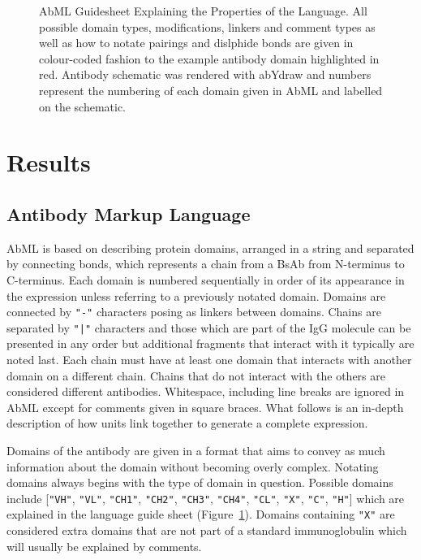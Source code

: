 \documentclass{article}
\begin{document}
\begin{figure}
\caption{\label{fig:1} AbML Guidesheet Explaining the Properties of
the Language. All possible domain types, modifications, linkers and
comment types as well as how to notate pairings and dislphide bonds
are given in colour-coded fashion to the example antibody domain
highlighted in red. Antibody schematic was rendered with abYdraw and
numbers represent the numbering of each domain given in AbML and
labelled on the schematic.}
\end{figure}

\section{Results}

\subsection{Antibody Markup Language}
AbML is based on describing protein domains, arranged in a string and
separated by connecting bonds, which represents a chain from a BsAb
from N-terminus to C-terminus. Each domain is numbered sequentially in
order of its appearance in the expression unless referring to a
previously notated domain. Domains are connected by \verb|"-"| characters
posing as linkers between domains. Chains are separated by \verb."|".
characters and those which are part of the IgG molecule can be
presented in any order but additional fragments that interact with it
typically are noted last. Each chain must have at least one domain
that interacts with another domain on a different chain. Chains that
do not interact with the others are considered different
antibodies. Whitespace, including line breaks are ignored in AbML
except for comments given in square braces. What follows is an
in-depth description of how units link together to generate a complete
expression. 

Domains of the antibody are given in a format that aims to convey as
much information about the domain without becoming overly
complex. Notating domains always begins with the type of domain in
question. Possible domains include [\verb|"VH"|, \verb|"VL"|,
\verb|"CH1"|, \verb|"CH2"|, \verb|"CH3"|, \verb|"CH4"|, \verb|"CL"|,
\verb|"X"|, \verb|"C"|, \verb|"H"|] which are explained in the
language guide sheet (Figure~\ref{fig:1}). Domains containing
\verb|"X"| are considered extra domains that are not part of a
standard immunoglobulin which will usually be explained by comments.
\end{document}
